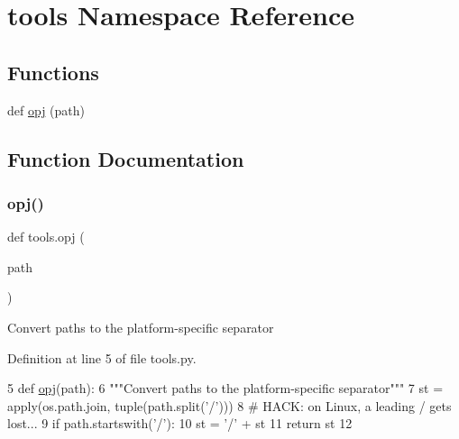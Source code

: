 \hypertarget{namespacetools}{}\section{tools Namespace Reference}
\label{namespacetools}
\subsection*{Functions}
\begin{DoxyCompactItemize}
\item 
def \hyperlink{namespacetools_a9eaf94e896cb3fae9773462bd4e0b626}{opj} (path)
\end{DoxyCompactItemize}


\subsection{Function Documentation}
\mbox{\label{namespacetools_a9eaf94e896cb3fae9773462bd4e0b626}} 
\subsubsection{\texorpdfstring{opj()}{opj()}}
{\footnotesize\ttfamily def tools.\+opj (\begin{DoxyParamCaption}\item[{}]{path }\end{DoxyParamCaption})}

\begin{DoxyVerb}Convert paths to the platform-specific separator\end{DoxyVerb}
 

Definition at line 5 of file tools.\+py.


\begin{DoxyCode}
5 \textcolor{keyword}{def }\hyperlink{namespacetools_a9eaf94e896cb3fae9773462bd4e0b626}{opj}(path):
6     \textcolor{stringliteral}{"""Convert paths to the platform-specific separator"""}
7     st = apply(os.path.join, tuple(path.split(\textcolor{stringliteral}{'/'})))
8     \textcolor{comment}{# HACK: on Linux, a leading / gets lost...}
9     \textcolor{keywordflow}{if} path.startswith(\textcolor{stringliteral}{'/'}):
10         st = \textcolor{stringliteral}{'/'} + st
11     \textcolor{keywordflow}{return} st
12 \end{DoxyCode}
